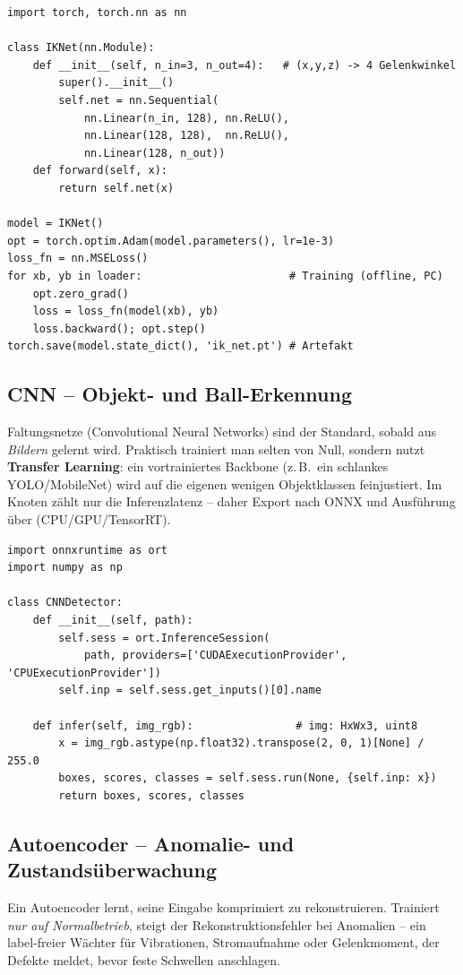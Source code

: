 \begin{lstlisting}[style=py,caption={MLP fuer inverse Kinematik (PyTorch)}]
import torch, torch.nn as nn

class IKNet(nn.Module):
    def __init__(self, n_in=3, n_out=4):   # (x,y,z) -> 4 Gelenkwinkel
        super().__init__()
        self.net = nn.Sequential(
            nn.Linear(n_in, 128), nn.ReLU(),
            nn.Linear(128, 128),  nn.ReLU(),
            nn.Linear(128, n_out))
    def forward(self, x):
        return self.net(x)

model = IKNet()
opt = torch.optim.Adam(model.parameters(), lr=1e-3)
loss_fn = nn.MSELoss()
for xb, yb in loader:                       # Training (offline, PC)
    opt.zero_grad()
    loss = loss_fn(model(xb), yb)
    loss.backward(); opt.step()
torch.save(model.state_dict(), 'ik_net.pt') # Artefakt
\end{lstlisting}

\subsection{CNN -- Objekt- und Ball-Erkennung}
Faltungsnetze (Convolutional Neural Networks) sind der Standard, sobald aus
\emph{Bildern} gelernt wird. Praktisch trainiert man selten von Null, sondern
nutzt \textbf{Transfer Learning}: ein vortrainiertes Backbone (z.\,B.\ ein
schlankes YOLO/MobileNet) wird auf die eigenen wenigen Objektklassen
feinjustiert. Im Knoten zählt nur die Inferenzlatenz -- daher Export nach ONNX
und Ausführung über  (CPU/GPU/TensorRT).

\begin{lstlisting}[style=py,caption={CNN-Inferenz im Knoten via ONNX Runtime}]
import onnxruntime as ort
import numpy as np

class CNNDetector:
    def __init__(self, path):
        self.sess = ort.InferenceSession(
            path, providers=['CUDAExecutionProvider', 'CPUExecutionProvider'])
        self.inp = self.sess.get_inputs()[0].name

    def infer(self, img_rgb):                # img: HxWx3, uint8
        x = img_rgb.astype(np.float32).transpose(2, 0, 1)[None] / 255.0
        boxes, scores, classes = self.sess.run(None, {self.inp: x})
        return boxes, scores, classes
\end{lstlisting}

\subsection{Autoencoder -- Anomalie- und Zustandsüberwachung}
Ein Autoencoder lernt, seine Eingabe komprimiert zu rekonstruieren. Trainiert
\emph{nur auf Normalbetrieb}, steigt der Rekonstruktionsfehler bei
Anomalien -- ein label-freier Wächter für Vibrationen, Stromaufnahme oder
Gelenkmoment, der Defekte meldet, bevor feste Schwellen anschlagen.

